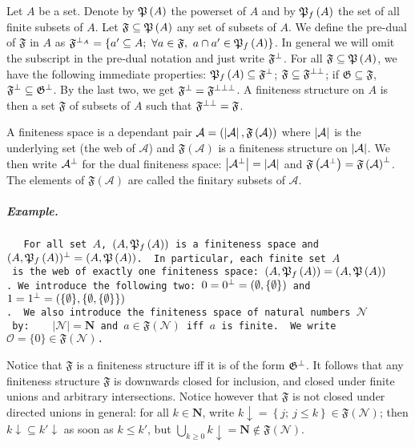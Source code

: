 Let \(A\) be a set. Denote by \(\mathfrak{P}\left(A\right)\) the powerset of \(A\) and
by \(\mathfrak{P}_f\left(A\right)\) the set of all finite subsets of \(A\). Let
\({\mathfrak F} \subseteq \mathfrak{P}\left(A\right)\) any set of subsets of \(A\). We
define the pre-dual of \({\mathfrak F}\) in \(A\) as
\({\mathfrak F}^{\bot_{A}}=\left\{a'\subseteq A;\ \forall a\in{\mathfrak F},\ a\cap a'\in\mathfrak{P}_f\left(A\right)\right\}\).
In general we will omit the subscript in the pre-dual notation and just
write \({\mathfrak F}^\bot\). For all
\({\mathfrak F}\subseteq\mathfrak{P}\left(A\right)\), we have the following immediate
properties: \(\mathfrak{P}_f\left(A\right)\subseteq {\mathfrak F}^\bot\);
\({\mathfrak F}\subseteq {\mathfrak F}^{\bot\bot}\); if
\({\mathfrak G}\subseteq{\mathfrak F}\),
\({\mathfrak F}^\bot\subseteq {\mathfrak G}^\bot\). By the last two, we
get \({\mathfrak F}^\bot = {\mathfrak F}^{\bot\bot\bot}\). A finiteness
structure on \(A\) is then a set \({\mathfrak F}\) of subsets of \(A\)
such that \({\mathfrak F}^{\bot\bot} = {\mathfrak F}\).

A finiteness space is a dependant pair
\({\mathcal A}=\left(\left|\mathcal A\right|,\mathfrak F\left(\mathcal A\right)\right)\)
where \(\left|\mathcal A\right|\) is the underlying set (the web of
\({\mathcal A}\)) and \(\mathfrak F\left(\mathcal A\right)\) is a
finiteness structure on \(\left|\mathcal A\right|\). We then write
\({\mathcal A}^\bot\) for the dual finiteness space:
\(\left|{\mathcal A}^\bot\right| = \left|\mathcal A\right|\) and
\(\mathfrak F\left({\mathcal A}^\bot\right)=\mathfrak F\left({\mathcal A}\right)^{\bot}\).
The elements of \(\mathfrak F\left(\mathcal A\right)\) are called the
finitary subsets of \({\mathcal A}\).

\subparagraph{Example.}\label{example.}

\texttt{~~~For~all~set~}\(A\)\texttt{,~}\((A,\mathfrak{P}_f\left(A\right))\)\texttt{~is~a~finiteness~space~and~}\((A,\mathfrak{P}_f\left(A\right))^\bot = (A,\mathfrak{P}\left(A\right))\)\texttt{.~~In~particular,~each~finite~set~}\(A\)\texttt{~is~the~web~of~exactly~one~finiteness~space:~}\((A,\mathfrak{P}_f\left(A\right))=(A,\mathfrak{P}\left(A\right))\)\texttt{.~We~introduce~the~following~two:~}\(0 = 0^\bot = \left(\emptyset, \{\emptyset\}\right)\)\texttt{~and~}\(1 = 1^\bot = \left(\{\emptyset\}, \{\emptyset, \{\emptyset\}\}\right)\)\texttt{.~~We~also~introduce~the~finiteness~space~of~natural~numbers~}\({\mathcal N}\)\texttt{~by:~~~~}\(|{\mathcal N}|={\mathbf N}\)\texttt{~and~}\(a\in\mathfrak F\left(\mathcal N\right)\)\texttt{~iff~}\(a\)\texttt{~is~finite.~~We~write~}\(\mathcal O=\{0\}\in\mathfrak F\left({\mathcal N}\right)\)\texttt{.}

Notice that \({\mathfrak F}\) is a finiteness structure iff it is of the
form \({\mathfrak G}^\bot\). It follows that any finiteness structure
\({\mathfrak F}\) is downwards closed for inclusion, and closed under
finite unions and arbitrary intersections. Notice however that
\({\mathfrak F}\) is not closed under directed unions in general: for
all \(k\in{\mathbf N}\), write
\(k{\downarrow}=\left\{j;\  j\le k\right\}\in\mathfrak F\left({\mathcal N}\right)\);
then \(k{\downarrow}\subseteq k'{\downarrow}\) as soon as \(k\le k'\),
but
\(\bigcup_{k\ge0} k{\downarrow}={\mathbf N}\not\in\mathfrak F\left({\mathcal N}\right)\).

